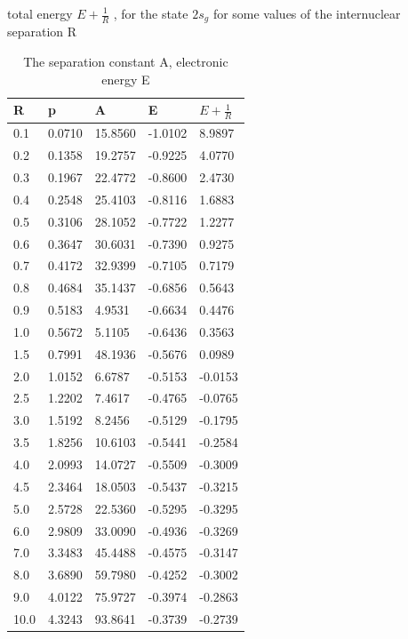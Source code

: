 \begin{table}[ht]
  \caption{ The separation constant A, electronic energy E}{ total energy $ E + \frac{1}{R} $ , for the state $ 2s_g $ for some values of the internuclear separation R } 
  \centering
  \label{2sg}
		\begin{tabular}{ m{6em} m{6em}  m{6em}  m{6em} m{6em} }
			\hline
			R & p & A & E & $ E + \frac{1}{R} $ \\ \hline \hline
      0.1 &0.0710 & 15.8560 & -1.0102 & 8.9897 \\
      0.2 & 0.1358 & 19.2757 & -0.9225 & 4.0770 \\
      0.3 & 0.1967 & 22.4772 & -0.8600 & 2.4730 \\
      0.4 & 0.2548 & 25.4103 & -0.8116 & 1.6883 \\
      0.5 & 0.3106 & 28.1052 & -0.7722 & 1.2277 \\
      0.6 & 0.3647 & 30.6031 & -0.7390 & 0.9275 \\
      0.7 & 0.4172 & 32.9399 & -0.7105 & 0.7179 \\
      0.8 & 0.4684 & 35.1437 & -0.6856 & 0.5643 \\
      0.9 & 0.5183 & 4.9531 & -0.6634 & 0.4476 \\
      1.0 & 0.5672 & 5.1105 & -0.6436 & 0.3563 \\
      1.5 & 0.7991 & 48.1936 & -0.5676 & 0.0989 \\
      2.0 & 1.0152 & 6.6787 & -0.5153 & -0.0153 \\
      2.5 & 1.2202 & 7.4617 & -0.4765 & -0.0765 \\
      3.0 & 1.5192 & 8.2456 & -0.5129 & -0.1795 \\
      3.5 & 1.8256 & 10.6103 & -0.5441 & -0.2584 \\
      4.0 & 2.0993 & 14.0727 & -0.5509 & -0.3009 \\
      4.5 & 2.3464 & 18.0503 & -0.5437 & -0.3215 \\
      5.0 & 2.5728 & 22.5360 & -0.5295 & -0.3295 \\
      6.0 & 2.9809 & 33.0090 & -0.4936 & -0.3269 \\
      7.0 & 3.3483 & 45.4488 & -0.4575 & -0.3147 \\
      8.0 & 3.6890 & 59.7980 & -0.4252 & -0.3002 \\
      9.0 & 4.0122 & 75.9727 & -0.3974 & -0.2863 \\
      10.0 & 4.3243 & 93.8641 & -0.3739 & -0.2739 \\
		\hline
		\end{tabular}
\end{table}


